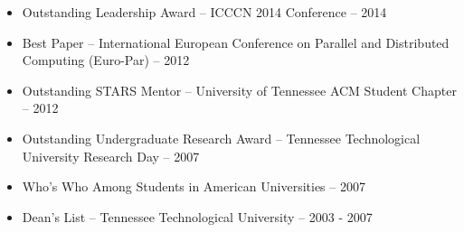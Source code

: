 \begin{itemize}
    \item Outstanding Leadership Award -- ICCCN 2014 Conference -- 2014
    \item Best Paper -- International European Conference on Parallel and Distributed Computing (Euro-Par) -- 2012
    \item Outstanding STARS Mentor -- University of Tennessee ACM Student Chapter -- 2012
    \item Outstanding Undergraduate Research Award -- Tennessee Technological University Research Day -- 2007
    \item Who's Who Among Students in American Universities -- 2007
    \item Dean's List -- Tennessee Technological University -- 2003 - 2007
\end{itemize}

